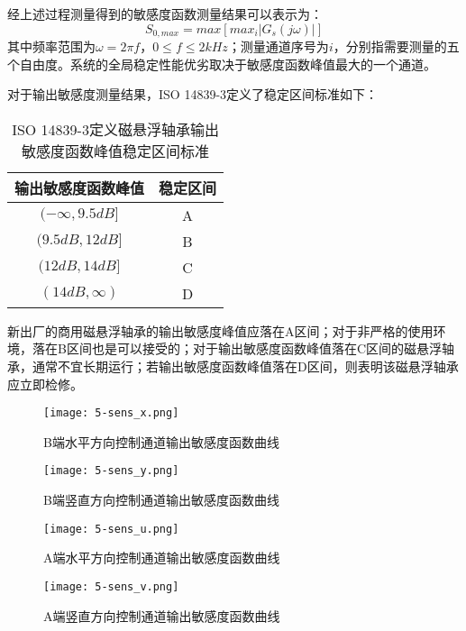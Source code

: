 经上述过程测量得到的敏感度函数测量结果可以表示为：
\begin{equation}
	S_{0,max} = max \left[ max_i \left|G_s(j\omega)\right| \right]
\end{equation}
其中频率范围为$\omega = 2 \pi f$，$0 \leq f \leq 2kHz$；测量通道序号为$i$，分别指需要测量的五个自由度。系统的全局稳定性能优劣取决于敏感度函数峰值最大的一个通道。

对于输出敏感度测量结果，ISO 14839-3定义了稳定区间标准如下：

\begin{table}[htb]
  \caption[ISO 14839-3定义磁悬浮轴承输出敏感度函数峰值稳定区间标准]{ISO 14839-3定义磁悬浮轴承输出敏感度函数峰值稳定区间标准\label{tab:amb_iso}}
  \begin{tabular}{cc}
    \toprule
    输出敏感度函数峰值 & 稳定区间 \\
    \midrule
    $(-\infty,9.5dB]$ & A\\
    $(9.5dB,12dB]$    & B\\
    $(12dB,14dB]$     & C\\
    $(14dB,\infty)$   & D\\
    \bottomrule
  \end{tabular}
\end{table}

新出厂的商用磁悬浮轴承的输出敏感度峰值应落在A区间；对于非严格的使用环境，落在B区间也是可以接受的；对于输出敏感度函数峰值落在C区间的磁悬浮轴承，通常不宜长期运行；若输出敏感度函数峰值落在D区间，则表明该磁悬浮轴承应立即检修。
\begin{figure}
	\texttt{[image: 5-sens\_x.png]}
	\caption{B端水平方向控制通道输出敏感度函数曲线}
	\label{fig:5-sens_x}
\end{figure}

\begin{figure}
	\texttt{[image: 5-sens\_y.png]}
	\caption{B端竖直方向控制通道输出敏感度函数曲线}
	\label{fig:5-sens_y}
\end{figure}

\begin{figure}
	\texttt{[image: 5-sens\_u.png]}
	\caption{A端水平方向控制通道输出敏感度函数曲线}
	\label{fig:5-sens_u}
\end{figure}

\begin{figure}
	\texttt{[image: 5-sens\_v.png]}
	\caption{A端竖直方向控制通道输出敏感度函数曲线}
	\label{fig:5-sens_v}
\end{figure}

